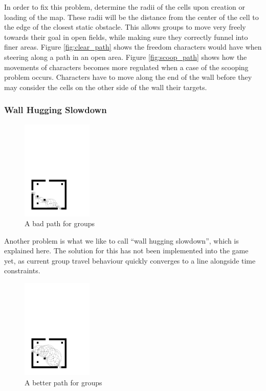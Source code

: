 In order to fix this problem, determine the radii of the cells upon creation or loading of the map. These radii will be the distance from the center of the cell to the edge of the closest static obstacle. This allows groups to move very freely towards their goal in open fields, while making sure they correctly funnel into finer areas. Figure \ref{fig:clear_path} shows the freedom characters would have when steering along a path in an open area. Figure \ref{fig:scoop_path} shows how the movements of characters becomes more regulated when a case of the scooping problem occurs. Characters have to move along the end of the wall before they may consider the cells on the other side of the wall their targets.

\subsubsection{Wall Hugging Slowdown}
\label{sec:extra_weight}
\begin{figure}
\includegraphics[width=0.30\textwidth]{images/obst_path1.pdf}
\caption{A bad path for groups}
\end{figure} 
Another problem is what we like to call ``wall hugging slowdown'', which is explained here. The solution for this has not been implemented into the game yet, as current group travel behaviour quickly converges to a line alongside time constraints.
\begin{figure}
\includegraphics[width=0.30\textwidth]{images/obst_path2.pdf}
\caption{A better path for groups}
\end{figure} 

